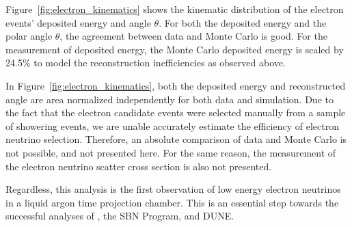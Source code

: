 Figure~\ref{fig:electron_kinematics} shows the kinematic distribution of the electron events' deposited energy and angle $\theta$.  For both the deposited energy and the polar angle $\theta$, the agreement between data and Monte Carlo is good.  For the measurement of deposited energy, the Monte Carlo deposited energy is scaled by 24.5\% to model the reconstruction inefficiencies as observed above.

In Figure~\ref{fig:electron_kinematics}, both the deposited energy and reconstructed angle are area normalized independently for both data and simulation.  Due to the fact that the electron candidate events were selected manually from a sample of showering events, we are unable accurately estimate the efficiency of electron neutrino selection.  Therefore, an absolute comparison of data and Monte Carlo is not possible, and not presented here.  For the same reason, the measurement of the electron neutrino scatter cross section is also not presented.

Regardless, this analysis is the first observation of low energy electron neutrinos in a liquid argon time projection chamber.  This is an essential step towards the successful analyses of \uboone, the SBN Program, and DUNE.


